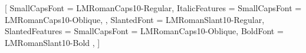    \selectfont

    \selectfont

    \selectfont %

\else

    \ifLuaTeX
      \setmainfont{Latin Modern Roman}[
        SmallCapsFont = {LMRomanCaps10-Regular},
        ItalicFeatures = {
          SmallCapsFont = {LMRomanCaps10-Oblique},
        },
        SlantedFont = {LMRomanSlant10-Regular},
        SlantedFeatures = {
          SmallCapsFont = {LMRomanCaps10-Oblique},
          BoldFont = {LMRomanSlant10-Bold}
        },
      ]
    \fi


